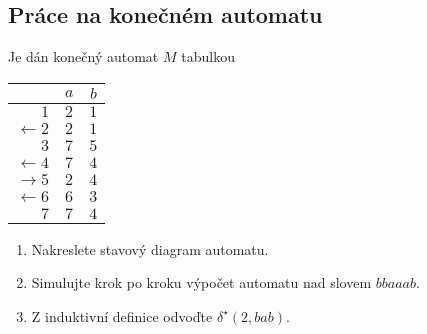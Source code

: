 \subsection{Práce na konečném automatu}
Je dán konečný automat $M$ tabulkou

\begin{multicols}{2}

\begin{tabular}{|r|c|c|}
    \hline
    & $a$ & $b$\\
    \hline
    \hline
    $1$            & $2$   & $1$\\
    $\leftarrow 2$ & $2$   & $1$\\
    $3$            & $7$   & $5$\\
    $\leftarrow 4$ & $7$   & $4$\\
    $\rightarrow 5$& $2$   & $4$\\
    $\leftarrow 6$ & $6$   & $3$\\
    $ 7$           & $7$   & $4$\\
    \hline
\end{tabular}

\columnbreak

\begin{enumerate}[noitemsep]
    \item Nakreslete stavový diagram automatu.
    \item Simulujte krok po kroku výpočet automatu nad slovem $bbaaab$.
    \item Z induktivní definice odvoďte $\delta^\star(2, bab)$.
\end{enumerate}

\end{multicols}


